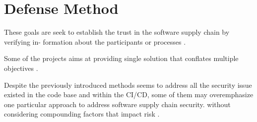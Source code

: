 \section{Defense Method}

These goals are seek to establish the trust in the software supply chain by verifying in-
formation about the participants or processes \cite{melara2022software}.

Some of the projects aims at providing single solution that conﬂates multiple objectives 
\cite{melara2022software}.

Despite the previously introduced methods seems to address all the security issue
existed in the code base and within the CI/CD, some of them may overemphasize one 
particular approach to address software supply chain security. without considering 
compounding factors that impact risk \cite{melara2022software}.